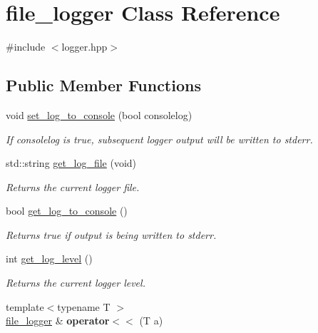 \hypertarget{classfile__logger}{\section{file\-\_\-logger Class Reference}
\label{classfile__logger}
}


{\ttfamily \#include $<$logger.\-hpp$>$}

\subsection*{Public Member Functions}
\begin{DoxyCompactItemize}
\item 
void \hyperlink{classfile__logger_afd49e36dd0cb905b9c8de05ec38eec5b}{set\-\_\-log\-\_\-to\-\_\-console} (bool consolelog)
\begin{DoxyCompactList}\small\item\em If consolelog is true, subsequent logger output will be written to stderr. \end{DoxyCompactList}\item 
\hypertarget{classfile__logger_ab1ac2156591d7b04d2d1bfbaf3eb4a69}{std\-::string \hyperlink{classfile__logger_ab1ac2156591d7b04d2d1bfbaf3eb4a69}{get\-\_\-log\-\_\-file} (void)}\label{classfile__logger_ab1ac2156591d7b04d2d1bfbaf3eb4a69}

\begin{DoxyCompactList}\small\item\em Returns the current logger file. \end{DoxyCompactList}\item 
\hypertarget{classfile__logger_acded5e9c6a2b21dfec2c889a9d0e5efd}{bool \hyperlink{classfile__logger_acded5e9c6a2b21dfec2c889a9d0e5efd}{get\-\_\-log\-\_\-to\-\_\-console} ()}\label{classfile__logger_acded5e9c6a2b21dfec2c889a9d0e5efd}

\begin{DoxyCompactList}\small\item\em Returns true if output is being written to stderr. \end{DoxyCompactList}\item 
\hypertarget{classfile__logger_a7e8dbb4fe48aa0983271e50e00406a2e}{int \hyperlink{classfile__logger_a7e8dbb4fe48aa0983271e50e00406a2e}{get\-\_\-log\-\_\-level} ()}\label{classfile__logger_a7e8dbb4fe48aa0983271e50e00406a2e}

\begin{DoxyCompactList}\small\item\em Returns the current logger level. \end{DoxyCompactList}\item 
\hypertarget{classfile__logger_a1af6d913dc8fa9bcad436909c1067414}{{\footnotesize template$<$typename T $>$ }\\\hyperlink{classfile__logger}{file\-\_\-logger} \& {\bfseries operator$<$$<$} (T a)}\label{classfile__logger_a1af6d913dc8fa9bcad436909c1067414}


\end{DoxyCompactItemize}
